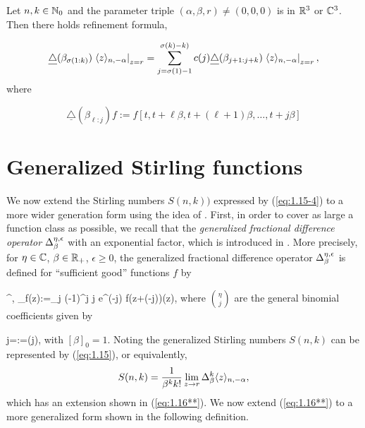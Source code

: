\begin{proposition}\label{pro:2.3}
Let $n,k\in{{\mathbb N}}_0$ and the parameter triple $(\alpha, \beta, r)\not= (0,0,0)$ is in ${{\mathbb R}}^3$ or ${{\mathbb C}}^3$. Then there holds
refinement formula,

\[
\underline\triangle (\beta_{\sigma(1:k)}) \left. \langle z\rangle_{n,-\alpha}\right|_{z=r}=\sum^{\sigma(k)-k)}_{j=\sigma(1)-1}c(j) \underline\triangle (\beta_{j+1:j+k}) \left. \langle z\rangle_{n,-\alpha}\right|_{z=r},
\]
where

\[
\underline\triangle (\beta_{\ell:j}) f:=f[t, t+\ell \beta, t+(\ell +1)\beta, \ldots, t+j\beta]
\]
\end{proposition}
\section{Generalized Stirling functions}
\setcounter{equation}{0}

We now extend the
Stirling numbers $S(n,k))$ expressed by (\ref{eq:1.15-4}) to a more wider generation form using the idea of \cite{BKT03}. First, in order to cover as large a function class as possible, we recall that the {\it generalized fractional difference operator} $\Delta_\beta^{\eta, {\epsilon}}$ with an exponential factor, which is introduced in \cite{BKT03}.  More precisely, for $\eta\in {{\mathbb C}}$, $\beta\in{{\mathbb R}}_+$, $\epsilon \geq 0$, the generalized fractional difference operator $\Delta_\beta^{\eta, {\epsilon}}$ is defined for ``sufficient good'' functions $f$ by

\be\label{eq:1.18}
\Delta^{\eta, \ep}_\beta f(z):=\sum_{j} (-1)^j {\eta \choose j} e^{(\eta-j)\ep} f(z+(\eta -j)\beta)\quad (z\in {\bC}),
\ee
where ${\eta\choose j}$ are the general binomial coefficients given by

\be\label{eq:1.19}
{\eta \choose j}=:=\quad (j\in {\bN}),
\ee
with $[\beta]_0=1$. Noting the generalized Stirling numbers $S(n,k)$ can be represented by (\ref{eq:1.15}),
or equivalently,
\[
S(n,k)=\frac{1}{\beta^kk!} \lim_{z\to r} \Delta^k_\beta \langle z\rangle_{n,-\alpha},
\]
which has an extension shown in (\ref{eq:1.16**}). We now extend (\ref{eq:1.16**}) to a more generalized form shown in the following definition.

